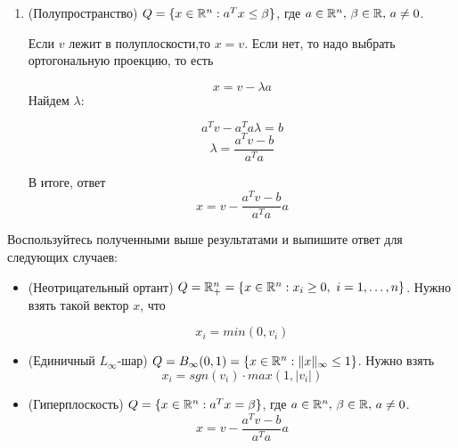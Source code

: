 \documentclass{article}
\begin{document}
\begin{enumerate}[label=\textbf{\arabic*}, leftmargin=0em]
\begin{enumerate}




\item (Полупространство) $Q = \{ x \in \mathbb{R}^n : a^T x \leq \beta \}$, где $a \in \mathbb{R}^n, \, \beta \in \mathbb{R}, \, a \neq 0$.

Если $v$ лежит в полуплоскости,то $x = v$. Если нет, то надо выбрать ортогональную проекцию, то есть

$$
x = v - \lambda a
$$
Найдем $\lambda$:

$$
a^T v - a^T a \lambda = b
$$
$$
\lambda = \displaystyle\frac{a^Tv - b}{a^Ta}
$$

В итоге, ответ
$$
x = v - \displaystyle\frac{a^Tv - b}{a^Ta} a
$$

\end{enumerate}
Воспользуйтесь полученными выше результатами и выпишите ответ для следующих случаев:
\begin{itemize}
\item (Неотрицательный ортант) $Q = \mathbb{R}^n_+ = \{ x \in \mathbb{R}^n : x_i \geq 0, \ i = 1, \dots, n \}$.
Нужно взять такой вектор $x$, что

$$
x_i = min(0, v_i)
$$
\item (Единичный $L_{\infty}$-шар) $Q = B_{\infty}(0, 1) = \{ x \in \mathbb{R}^n : \| x \|_{\infty} \leq 1 \}$.
Нужно взять
$$
x_i = sgn(v_i) \cdot max(1, |v_i|)
$$
\item (Гиперплоскость) $Q = \{ x \in \mathbb{R}^n : a^T x = \beta \}$, где $a \in \mathbb{R}^n, \, \beta \in \mathbb{R}, \, a \neq 0$.
$$
x = v - \displaystyle\frac{a^Tv - b}{a^Ta} a
$$

\end{itemize}




\end{enumerate}
\end{document}
